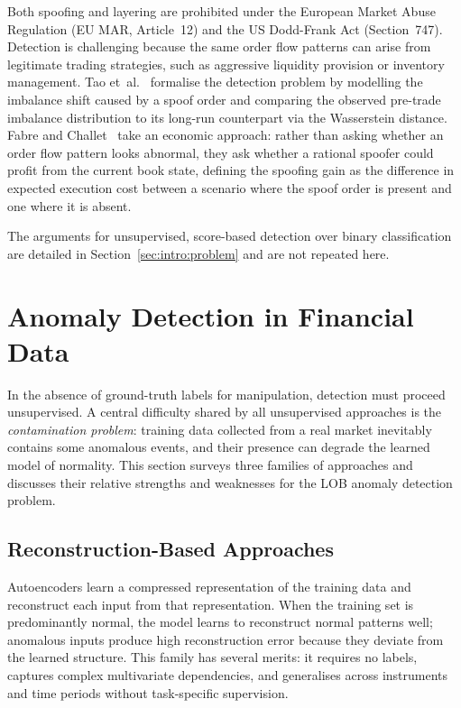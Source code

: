 \documentclass[11pt]{report}
\begin{document}
Both spoofing and layering are prohibited under the European Market Abuse Regulation (EU MAR, Article~12) and the US Dodd-Frank Act (Section~747). Detection is challenging because the same order flow patterns can arise from legitimate trading strategies, such as aggressive liquidity provision or inventory management. Tao et~al.~\cite{tao_2020} formalise the detection problem by modelling the imbalance shift caused by a spoof order and comparing the observed pre-trade imbalance distribution to its long-run counterpart via the Wasserstein distance. Fabre and Challet~\cite{fabre_2025} take an economic approach: rather than asking whether an order flow pattern looks abnormal, they ask whether a rational spoofer could profit from the current book state, defining the spoofing gain as the difference in expected execution cost between a scenario where the spoof order is present and one where it is absent.

The arguments for unsupervised, score-based detection over binary classification are detailed in Section~\ref{sec:intro:problem} and are not repeated here.

\section{Anomaly Detection in Financial Data}\label{sec:background:anomaly}

In the absence of ground-truth labels for manipulation, detection must proceed unsupervised. A central difficulty shared by all unsupervised approaches is the \emph{contamination problem}: training data collected from a real market inevitably contains some anomalous events, and their presence can degrade the learned model of normality. This section surveys three families of approaches and discusses their relative strengths and weaknesses for the LOB anomaly detection problem.

\subsection{Reconstruction-Based Approaches}\label{subsec:background:reconstruction}

Autoencoders learn a compressed representation of the training data and reconstruct each input from that representation. When the training set is predominantly normal, the model learns to reconstruct normal patterns well; anomalous inputs produce high reconstruction error because they deviate from the learned structure. This family has several merits: it requires no labels, captures complex multivariate dependencies, and generalises across instruments and time periods without task-specific supervision.
\end{document}
